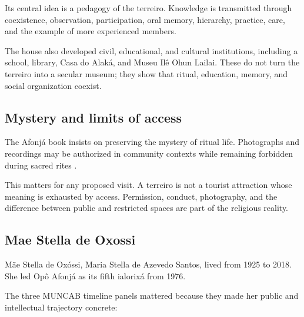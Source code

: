 Its central idea is a pedagogy of the
terreiro.  Knowledge is transmitted through
coexistence, observation, participation,
oral memory, hierarchy, practice, care,
and the example of more experienced
members.

The house also developed civil,
educational, and cultural institutions,
including a school, library, Casa do Alak\'a,
and Museu Il\^e Ohun Lailai.  These do not
turn the terreiro into a secular museum;
they show that ritual, education, memory,
and social organization coexist.

\subsection{Mystery and limits of access}
\label{religion-section-mystery-limits}

The Afonj\'a book insists on preserving the
mystery of ritual life.  Photographs and
recordings may be authorized in community
contexts while remaining forbidden during
sacred rites
\cite{barata2025ancestralidade}.

This matters for any proposed visit.  A
terreiro is not a tourist attraction whose
meaning is exhausted by access.  Permission,
conduct, photography, and the difference
between public and restricted spaces are
part of the religious reality.

\subsection{Mae Stella de Oxossi}
\label{religion-section-mae-stella}

M\~ae Stella de Ox\'ossi, Maria Stella de
Azevedo Santos, lived from 1925 to 2018.
She led Op\^o Afonj\'a as its fifth
ialorix\'a from 1976.

The three MUNCAB timeline panels mattered
because they made her public and
intellectual trajectory concrete:

